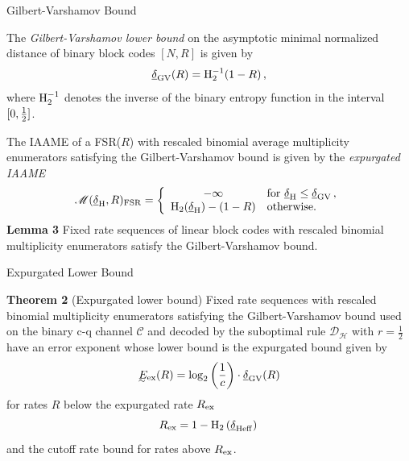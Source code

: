 \begin{slide*}\sf
\begin{center}{\bsf Gilbert-Varshamov Bound}\end{center}
\vfill
The \emph{Gilbert-Varshamov lower bound} on the asymptotic 
minimal normalized distance of binary block codes $[N,R]$ 
is given by
$$ \underline{\delta}_{\rm GV}(R) = {\rm H}_2^{-1}(1-R)\,, $$
where ${\rm H}_2^{-1}$ denotes the inverse of the binary entropy 
function in the interval $[0,{1\over 2}]$. 

The IAAME of a FSR($R$) with rescaled binomial average multiplicity enumerators 
satisfying the Gilbert-Varshamov bound is given by the 
{\red \emph{expurgated IAAME}}
$$
  {\mathscr M}(\underline{\delta}_{\rm H},R)_{\rm FSR} = \left\{ 
  \begin{array}{cl}
    -\infty & \mbox{for } \underline{\delta}_{\rm H} \le 
    \underline{\delta}_{\rm GV}\,, \\
    {\rm H}_2(\underline{\delta}_{\rm H}) - (1 - R) & \mbox{otherwise}.
   \end{array} \right.
$$
\vfill
{\bf Lemma 3}
Fixed rate sequences of linear block codes with rescaled binomial multiplicity
enumerators satisfy the Gilbert-Varshamov bound.
\vfill
\end{slide*}

\begin{slide*}\sf
\begin{center}{\bsf Expurgated Lower Bound}\end{center}
\vfill
{\bf Theorem 2} (Expurgated lower bound)
Fixed rate sequences with rescaled binomial multiplicity enumerators 
satisfying the Gilbert-Varshamov bound used on the binary c-q channel 
${\mathscr C}$ and decoded by the suboptimal rule ${\mathscr D}_{{\mathcal H}}$ 
with $r=\frac{1}{2}$ have an error exponent whose lower bound is the 
expurgated bound given by
$$ \lowE_{\rm ex}(R)=\log_2\left({1\over c}\right) \cdot 
  \underline{\delta}_{\rm GV}(R) $$
for rates $R$ below the expurgated rate $R_{\rm ex}$
$$ R_{\rm ex} = 1-{\rm H}_2\left(\underline{\delta}_{\rm H eff}\right)\, $$
and the cutoff rate bound for rates above $R_{\rm ex}$.
\vfill
\end{slide*}

